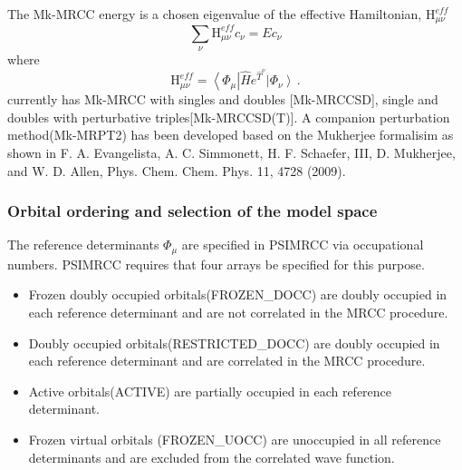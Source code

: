 The Mk-MRCC energy is a chosen eigenvalue of the effective Hamiltonian, $\textrm{H}^{eff}_{\mu \nu}$
 \begin{equation*}
\sum_\nu \textrm{H}^{eff}_{\mu \nu} c_\nu =E c_\nu
 \end{equation*}
where 
\begin{equation*}
\textrm{H}^{eff}_{\mu \nu} = \left \langle \Phi_\mu \right | \hat{H}e^{\hat{T}^\nu} \left | \Phi_\nu \right \rangle \, \textrm{.}
\end{equation*}
 \PSIfour currently has Mk-MRCC with singles and doubles [Mk-MRCCSD], single and doubles with perturbative triples[Mk-MRCCSD(T)]. A companion perturbation method(Mk-MRPT2) has been developed based on the Mukherjee formalisim as shown in F. A. Evangelista, A. C. Simmonett, H. F. Schaefer, III, D. Mukherjee, and W. D. Allen, Phys. Chem. Chem. Phys. 11, 4728 (2009). 
\\
\subsubsection{Orbital ordering and selection of the model space}
The reference determinants $\Phi_\mu$ are specified in PSIMRCC via occupational numbers. PSIMRCC requires that four arrays be specified for this purpose.

\begin{itemize}
\item Frozen doubly occupied orbitals(FROZEN\_DOCC) are doubly occupied in each reference determinant and are not correlated in the MRCC procedure.
\item Doubly occupied orbitals(RESTRICTED\_DOCC)  are doubly occupied in each reference determinant and are correlated in the MRCC procedure.
\item Active orbitals(ACTIVE) are partially occupied in each reference determinant.
\item Frozen virtual orbitals (FROZEN\_UOCC) are unoccupied in all reference determinants and are excluded from the correlated wave function.
\end{itemize} 

